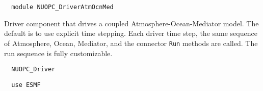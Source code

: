  
\setlength{\parskip}{0pt}
\setlength{\parindent}{0pt}
\setlength{\baselineskip}{11pt}
 
\def\bv{\begin{verbatim}}
\def\ev{\end{verbatim}}
\def\be{\begin{equation}}
\def\ee{\end{equation}}
\def\bea{\begin{eqnarray}}
\def\eea{\end{eqnarray}}
\def\bi{\begin{itemize}}
\def\ei{\end{itemize}}
\def\bn{\begin{enumerate}}
\def\en{\end{enumerate}}
\def\bd{\begin{description}}
\def\ed{\end{description}}
\def\({\left (}
\def\){\right )}
\def\[{\left [}
\def\]{\right ]}
\def\<{\left  \langle}
\def\>{\right \rangle}
\def\cI{{\cal I}}
\def\diag{\mathop{\rm diag}}
\def\tr{\mathop{\rm tr}}


\begin{verbatim}  module NUOPC_DriverAtmOcnMed
\end{verbatim}

Driver component that drives a coupled Atmosphere-Ocean-Mediator model. The default is to use explicit time stepping. Each driver time step, the same sequence of Atmosphere, Ocean, Mediator, and the connector {\tt Run} methods are called. The run sequence is fully customizable.

\begin{verbatim}  NUOPC_Driver
\end{verbatim}

\begin{verbatim}  use ESMF
\end{verbatim}

